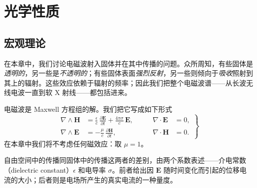 
\chapter{光学性质}


\section{宏观理论}

在本章中，我们讨论电磁波射入固体并在其中传播的问题。众所周知，有些固体是\emph{透明的}，另一些是\emph{不透明的}；有些固体表面\emph{强烈反射}，另一些则倾向于\emph{吸收}照射到其上的辐射。这些效应依赖于辐射的频率；因此我们把整个电磁波谱——从长波无线电波一直到软 X 射线——都包括进来。

电磁波是 Maxwell 方程组的解。我们把它写成如下形式
\begin{equation*}
\left.\begin{aligned}
\nabla\wedge\mathbf{H} &= \frac{\epsilon}{c}\,\frac{\partial\mathbf{E}}{\partial t} + \frac{4\pi\sigma}{c}\,\mathbf{E}, &\qquad \nabla\cdot\mathbf{E} &= 0,\\[4pt]
\nabla\wedge\mathbf{E} &= -\frac{\mu}{c}\,\frac{\partial\mathbf{H}}{\partial t}, &\qquad \nabla\cdot\mathbf{H} &= 0.
\end{aligned}\right\}\tag{8.1}
\end{equation*}
在本章中我们将不考虑任何磁效应：取 $\mu = 1$。

自由空间中的传播同固体中的传播这两者的差别，由两个系数表述——介电常数（dielectric constant）$\epsilon$ 和电导率 $\sigma$。前者给出因 $\mathbf{E}$ 随时间变化而引起的位移电流的大小；后者则是电场所产生的真实电流的一种量度。

